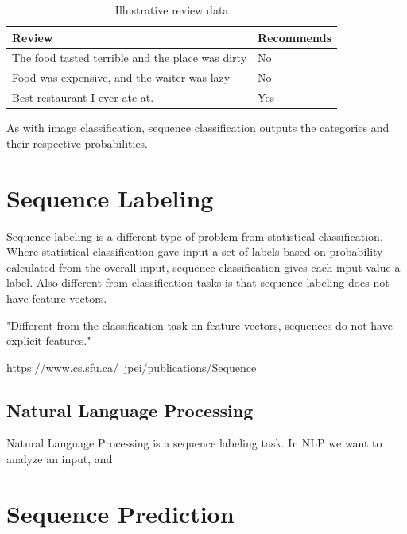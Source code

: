 \begin{table}[ht]
    \centering
    \begin{tabular}{|l|l|}
        \hline 
        \textbf{Review}                                  & \textbf{Recommends} \\ \hline
        The food tasted terrible and the place was dirty & No                  \\ \hline
        Food was expensive, and the waiter was lazy      & No                  \\ \hline
        Best restaurant I ever ate at.                   & Yes                 \\ \hline
    \end{tabular}
    \label{table:sequence-classification-illustration}
    \caption{Illustrative review data}
\end{table}

As with image classification, sequence classification outputs the categories and their respective probabilities. 


\section{Sequence Labeling}
Sequence labeling is a different type of problem from statistical classification. Where statistical classification gave input a set of labels based on probability calculated from the overall input, sequence classification gives each input value a label. Also different from classification tasks is that sequence labeling does not have feature vectors.

"Different from
the classification task on feature vectors, sequences do not
have explicit features."

https://www.cs.sfu.ca/~jpei/publications/Sequence%

\subsection{Natural Language Processing}
Natural Language Processing is a sequence labeling task. In NLP we want to analyze an input, and 


\section{Sequence Prediction}

